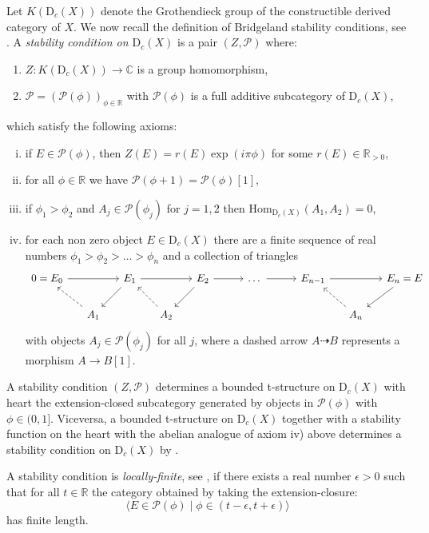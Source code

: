 \documentclass[11pt]{amsart}
\theoremstyle{definition}
\newcommand{\R}{\mathbb{R}}
\newcommand{\C}{\mathbb{C}}
\newcommand{\cat}[1]{\mathrm{#1}}
\newcommand{\constr}[2]{\cat{D}_{#1}({#2})}
\newcommand{\Mor}[3]{{\mathrm{Hom}}_{#1}\!\left(#2,#3\right)}
\newcommand{\sh}[1]{\mathcal{#1}}
\begin{document}
Let $K(\constr{c}{X})$ denote the Grothendieck group of the constructible derived category of $X$. We now recall the definition of Bridgeland stability conditions, see \cite[Definition 1.1]{bridgeland07}. A {\em stability condition on $\constr{c}{X}$} is a pair $(Z,\sh{P})$ where:
\begin{enumerate}
    \item $Z\colon K(\constr{c}{X})\to\C$ is a group homomorphism,
    \item $\sh{P}=\left( \sh{P}(\phi) \right)_{\phi\in\R}$ with $\sh{P}(\phi)$ is a full additive subcategory of $\constr{c}{X}$,
\end{enumerate}
which satisfy the following axioms:
\begin{enumerate}[i)]
    \item if $E\in\sh{P}(\phi)$, then $Z(E)=r(E)\exp(i\pi\phi)$ for some $r(E)\in\R_{>0}$,
    \item for all $\phi\in\R$ we have $\sh{P}(\phi+1)=\sh{P}(\phi)[1]$,
    \item if $\phi_1>\phi_2$ and $A_j\in\sh{P}(\phi_j)$ for $j=1,2$ then $\Mor{\constr{c}{X}}{A_1}{A_2}=0$,
    \item for each non zero object $E\in\constr{c}{X}$ there are a finite sequence of real numbers $\phi_1>\phi_2>\ldots>\phi_n$ and a collection of triangles
    \begin{equation*}
    \begin{tikzcd}[column sep={0.5cm}]
    0=E_0\ar[rr] && E_1\ar[rr]\ar[dl]  && E_2\ar[rr]\ar[dl] && \ldots\ar[rr] && E_{n-1}\ar[rr] && E_n=E \ar[dl] \\ 
    & A_1\ar[ul,dashed] && A_2\ar[ul,dashed] && && && A_n\ar[ul,dashed]
    \end{tikzcd}
    \end{equation*}
    with objects $A_j\in\sh{P}(\phi_j)$ for all $j$, where a dashed arrow $A\dashrightarrow B$ represents a morphism $A\to B[1]$.
\end{enumerate}

A stability condition $(Z,\sh{P})$ determines a bounded t-structure on $\constr{c}{X}$ with heart the extension-closed subcategory generated by objects in $\sh{P}(\phi)$ with $\phi\in(0,1]$. Viceversa, a bounded t-structure on $\constr{c}{X}$ together with a stability function on the heart with the abelian analogue of axiom iv) above determines a stability condition on $\constr{c}{X}$ by \cite[Proposition 5.3]{bridgeland07}.

A stability condition is {\em locally-finite}, see \cite[Definition 5.7]{bridgeland07}, if there exists a real number $\epsilon>0$ such that for all $t\in\R$ the category obtained by taking the extension-closure:
\[
\langle E\in\sh{P}(\phi) \mid \phi\in(t-\epsilon,t+\epsilon)\rangle
\]
has finite length.
\end{document}
